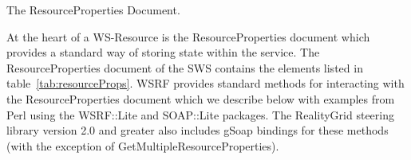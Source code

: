 \documentclass[a4paper]{article}
\begin{document}

\begin{section}{The ResourceProperties Document.}
\label{sec:RPDoc}

At the heart of a WS-Resource is the ResourceProperties document which
provides a standard way of storing state within the service.  The
ResourceProperties document of the SWS contains the elements listed in
table~\ref{tab:resourceProps}.  WSRF provides standard methods for
interacting with the ResourceProperties document which we describe
below with examples from Perl using the WSRF::Lite and SOAP::Lite
packages.  The RealityGrid steering library version 2.0 and greater
also includes gSoap bindings for these methods (with the exception
of GetMultipleResourceProperties).


\end{section}
\end{document}
